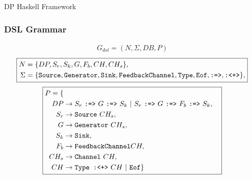 \documentclass{beamer}
\begin{document}
  \begin{frame}[fragile]{DP Haskell Framework}
    \frametitle{DSL Grammar}
    \small
    \begin{equation*}
      \boxed{
       \begin{aligned}
      G_{dsl} = (N, \Sigma, DB, P)
      \end{aligned}
      }
  \end{equation*}
  \tiny
      \begin{equation*}
          \boxed{
           \begin{aligned}
          N &= \{DP,S_r,S_k,G,F_b,CH,CH_s\},\\
          \Sigma &= \{\text{\texttt{Source}},\text{\texttt{Generator}},\text{\texttt{Sink}},\text{\texttt{FeedbackChannel}},\text{\texttt{Type}},\text{\texttt{Eof}},\text{\texttt{:=>}},\text{\texttt{:<+>}}\},
          \end{aligned}
          }
      \end{equation*}
    \small
    \begin{equation*}
      \boxed{
        \begin{aligned}
      P = \{\\
      DP  &\rightarrow S_r\ \text{\texttt{:=>}}\ G\ \text{\texttt{:=>}}\ S_k\ |\ S_r\ \text{\texttt{:=>}}\ G\ \text{\texttt{:=>}}\ F_b\ \text{\texttt{:=>}}\ S_k,\\
      S_r &\rightarrow \text{\texttt{Source}}\ CH_s,\\
      G   &\rightarrow \text{\texttt{Generator}}\ CH_s,\\
      S_k &\rightarrow \text{\texttt{Sink}},\\
      F_b &\rightarrow \text{\texttt{FeedbackChannel}} CH,\\
      CH_s &\rightarrow \text{\texttt{Channel}}\ CH,\\
      CH &\rightarrow \text{\texttt{Type :<+>}}\ CH\ |\ \text{\texttt{Eof}}\}
    \end{aligned}
    }
    \end{equation*}
  \end{frame}
\end{document}
